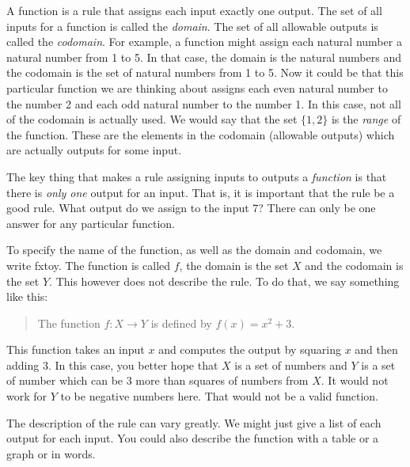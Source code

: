 \documentclass[12pt]{article}
\begin{document}
A function is a rule that assigns each input exactly one output.  The set of all inputs for a function is called the \emph{domain}.  The set of all allowable outputs is called the \emph{codomain}.  For example, a function might assign each natural number a natural number from 1 to 5.  In that case, the domain is the natural numbers and the codomain is the set of natural numbers from 1 to 5. Now it could be that this particular function we are thinking about assigns each even natural number to the number 2 and each odd natural number to the number 1.  In this case, not all of the codomain is actually used.  We would say that the set $\{1,2\}$ is the \emph{range} of the function. These are the elements in the codomain (allowable outputs) which are actually outputs for some input. 

The key thing that makes a rule assigning inputs to outputs a \emph{function} is that there is \emph{only one} output for an input.  That is, it is important that the rule be a good rule.  What output do we assign to the input 7?  There can only be one answer for any particular function. 

To specify the name of the function, as well as the domain and codomain, we write \gls{fxtoy}.  The function is called $f$, the domain is the set $X$ and the codomain is the set $Y$.  This however does not describe the rule.  To do that, we say something like this:

\begin{quote}
  The function $f:X \to Y$ is defined by $f(x) = x^2 + 3$.
\end{quote}

This function takes an input $x$ and computes the output by squaring $x$ and then adding 3.  In this case, you better hope that $X$ is a set of numbers and $Y$ is a set of number which can be 3 more than squares of numbers from $X$.  It would not work for $Y$ to be negative numbers here. That would not be a valid function.

The description of the rule can vary greatly.  We might just give a list of each output for each input.  You could also describe the function with a table or a graph or in words.
\end{document}

